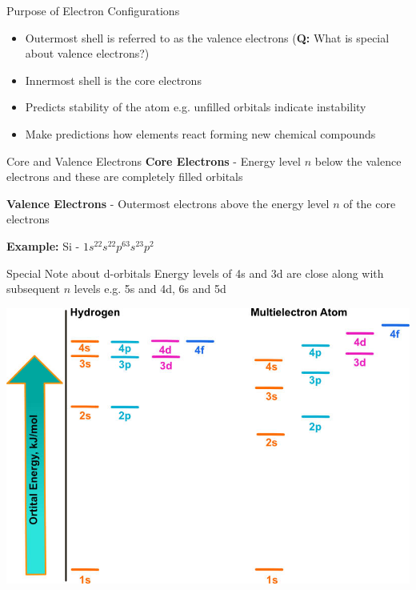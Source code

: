 \documentclass[11pt]{beamer}
\begin{document}
\begin{frame}{Purpose of Electron Configurations}
  \begin{itemize}
  \item Outermost shell is referred to as the valence
    electrons (\textbf{Q:} What is special about valence electrons?)
  \item Innermost shell is the core electrons
  \item Predicts stability of the atom e.g. unfilled orbitals
    indicate instability
  \item Make predictions how elements react forming new chemical
    compounds
  \end{itemize}
\end{frame}

\begin{frame}{Core and Valence Electrons}
  \textbf{Core Electrons} - Energy level $n$ below the valence
  electrons and these are completely filled orbitals

  \textbf{Valence Electrons} - Outermost electrons above the energy
  level $n$ of the core electrons

  \textbf{Example:} Si - $1s^22s^22p^63s^23p^2$
\end{frame}

\begin{frame}{Special Note about d-orbitals}
  Energy levels of 4s and 3d are close along with subsequent $n$ levels
  e.g. 5s and 4d, 6s and 5d
  
  \centering
  \includegraphics[scale=1.3]{orbital_energy}
\end{frame}
\end{document}

